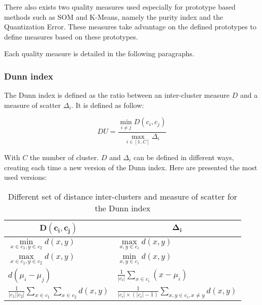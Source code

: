 There also exists two quality measures used especially for prototype based
methods such as SOM and K-Means, namely the purity index and the Quantization 
Error. These measures take advantage on the defined prototypes to define 
measures based on these prototypes.

Each quality measure is detailed in the following paragraphs.

    \subsubsection{Dunn index}
    The Dunn index is defined as the ratio between an inter-cluster measure $D$ and a measure of scatter $\Delta_i$. It is defined as follow:

    \begin{equation}
        DU = \frac{\min\limits_{i \neq j}D(c_i, c_j)}{\max\limits_{i \in [1..C]} \Delta_i}
        \label{eq:du_index}
    \end{equation}

    With $C$ the number of cluster. $D$ and $\Delta_i$ can be defined in different ways, creating each time a new version of the Dunn index. Here are presented the most used versions:

    \vspace{0.8cm}

    {\setlength{\extrarowheight}{10pt}%
    \begin{table}[h]
    \centering
    \begin{tabular}{ll}
    \multicolumn{1}{c}{$\mathbf{D(c_i, c_j)}$}                   & \multicolumn{1}{c}{$\mathbf{\Delta_i}$}                                   \\ [10pt] \bottomrule
    $\min\limits_{x \in c_1, y \in c_2} d(x, y)$                           & $\max\limits_{x, y \in c_i} d(x,y)$                                                       \\ [10pt] \bottomrule
    $\max\limits_{x \in c_1, y \in c_2} d(x, y)$                           & $\min\limits_{x, y \in c_i} d(x,y)$                                                       \\ [10pt] \bottomrule
    $d(\mu_i - \mu_j)$                                             & $\frac{1}{|c_i|}\sum_{x \in c_i}(x - \mu_i)$                               \\ [10pt] \bottomrule
    $\frac{1}{|c_1||c_2|}\sum\limits_{x \in c_1}\sum\limits_{x \in c_2} d(x, y)$ & $\frac{1}{|c_i| \times (|c_i| - 1)} \sum\limits_{x, y \in c_i, x \neq y} d(x, y)$ \\ [10pt] \bottomrule
    \end{tabular}
    \caption{Different set of distance inter-clusters and measure of scatter for the Dunn index}
\label{tab:all_dunn_index}
    \end{table}}

